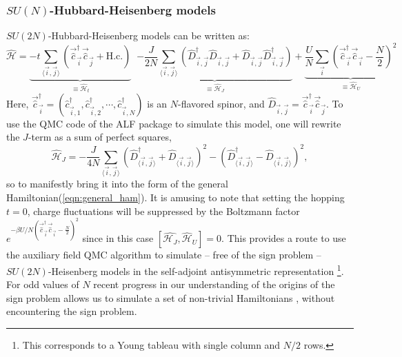 \documentclass{SciPost}
\begin{document}
\subsubsection{$SU(N)$-Hubbard-Heisenberg models}
%
$SU(2N)$-Hubbard-Heisenberg \cite{Assaad04,Lang13} models can be written as:
\begin{equation}
 \hat{\mathcal{H}}  =  
 \underbrace{ - t \sum_{ \langle \vec{i},\vec{j} \rangle }    \left(  \vec{\hat{c}}^{\dagger}_{\vec{i}}  \vec{\hat{c}}^{\phantom{\dagger}}_{\vec{j}} + \text{H.c.} \right) }_{\equiv \hat{\mathcal{H}}_t} \; \; 
\underbrace{ -\frac{J}{2 N}  \sum_{ \langle \vec{i},\vec{j} \rangle  } \left(
           \hat{D}^{\dagger}_{ \vec{i},\vec{j} }\hat{D}^{\phantom\dagger}_{ \vec{i},\vec{j}}  +
            \hat{D}^{\phantom\dagger}_{ \vec{i},\vec{j} } \hat{D}^{\dagger}_{ \vec{i},\vec{j} }  \right) }_{\equiv\hat{\mathcal{H}}_J}
            + 
 \underbrace{\frac{U}{N}  \sum_{\vec{i}} \left(
             \vec{\hat{c}}^{\dagger}_{\vec{i}}  \vec{\hat{c}}^{\phantom\dagger}_{\vec{i}} -  {\frac{N}{2} } \right)^2}_{\equiv \hat{\mathcal{H}}_U}
\end{equation}
Here,
$ \vec{\hat{c}}^{\dagger}_{\vec{i}} =
(\hat{c}^{\dagger}_{\vec{i},1},  \hat{c}^{\dagger}_{\vec{i},2}, \cdots, \hat{c}^{\dagger}_{\vec{i}, N } ) $  is an
$N$-flavored spinor, and $ \hat{D}_{ \vec{i},\vec{j}} = \vec{\hat{c}}^{\dagger}_{\vec{i}}
\vec{\hat{c}}_{\vec{j}}  $.
To use the QMC code of the ALF package  to simulate this model, one will rewrite  the $J$-term as a sum of perfect squares, 
\begin{equation}
        \hat{\mathcal{H}}_J =  -\frac{J}{4 N}  \sum_{  \langle \vec{i}, \vec{j} \rangle }
        \left(\hat{D}^{\dagger}_{  \langle \vec{i}, \vec{j} \rangle  } +  \hat{D}_{  \langle \vec{i}, \vec{j} \rangle }  \right)^2  -
        \left(\hat{D}^{\dagger}_{   \langle \vec{i}, \vec{j} \rangle } -  \hat{D}_{  \langle \vec{i}, \vec{j} \rangle}  \right)^2,
\end{equation}
so to manifestly bring it into the form of the general Hamiltonian(\ref{eqn:general_ham}). 
It is amusing to note that setting the hopping $t=0$,    charge fluctuations  will be suppressed by the  Boltzmann factor $e^{-\beta U /N \left(  \vec{\hat{c}}^{\dagger}_{\vec{i}}  \vec{\hat{c}}^{\phantom\dagger}_{\vec{i}} -  {\frac{N}{2} } \right)^2 } $ 
since in this case  $ \left[   \hat{\mathcal{H}_J}, \hat{\mathcal{H}}_U \right]  = 0 $.
This provides a route to use the auxiliary field QMC algorithm  to simulate -- free of the sign problem -- $SU(2N)$-Heisenberg models in the self-adjoint antisymmetric representation \footnote{ This corresponds to a Young tableau with single column and $N/2$ rows.}.
For odd values of $N$ recent progress  in our understanding of the  origins of the sign problem \cite{Wei16}  allows us to simulate  a set of non-trivial Hamiltonians \cite{Li15,Assaad16},  without encountering the sign problem.
%
\end{document}
